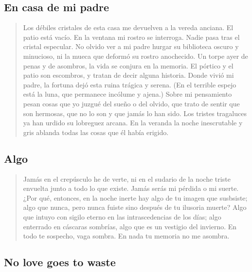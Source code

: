 \documentclass[a4paper, 12pt]{article}
\begin{document}
\pagebreak
\subsection{En casa de mi padre}

\begin{verse}
   Los débiles cristales de esta casa 
   me devuelven a la vereda anciana.
   El patio está vacío. En la ventana 
   mi rostro se interroga. Nadie pasa 
   tras el cristal especular. No olvido 
   ver a mi padre hurgar su biblioteca
   oscuro y minucioso, ni la mueca 
   que deformó su rostro anochecido.
   Un torpe ayer de penas y de asombros,
   la vida se conjura en la memoria.
   El pórtico y el patio son escombros,
   y tratan de decir alguna historia.
   Donde vivió mi padre, la fortuna 
   dejó esta ruina trágica y serena.
   (En el terrible espejo está la luna,
   que permanece incólume y ajena.)
   Sobre mi pensamiento pesan cosas 
   que yo juzgué del sueño o del olvido,
   que trato de sentir que son hermosas,
   que no lo son y que jamás lo han sido.
   Los tristes tragaluces ya han urdido
   su lobreguez arcana. En la veranda 
   la noche inescrutable y gris ablanda 
   todas las cosas que él había erigido.
\end{verse}

\pagebreak
\subsection{Algo}

\begin{verse}
    
Jamás en el crepúsculo he de verte,
ni en el sudario de la noche triste 
envuelta junto a todo lo que existe.
Jamás serás mi pérdida o mi suerte.
¿Por qué, entonces, en la noche inerte 
hay algo de tu imagen que susbsiste;
algo que nunca, pero nunca fuiste 
sino después de tu ilusoria muerte?
Algo que intuyo con sigilo eterno
en las intrascedencias de los días;
algo enterrado en cáscaras sombrías,
algo que es un vestigio del invierno.
En todo te sospecho, vaga sombra.
En nada tu memoria no me asombra.


\end{verse}

\pagebreak
\subsection{No love goes to waste}
~ 
\end{document}
